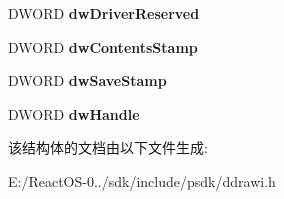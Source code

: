 \begin{DoxyCompactItemize}
\begin{tabbing}
\end{tabbing}\item 
\mbox{\label{struct___d_d_r_a_w_i___d_d_r_a_w_p_a_l_e_t_t_e___g_b_l_adf8b86b586ade3be20c115117d8d916c}} 
D\+W\+O\+RD {\bfseries dw\+Driver\+Reserved}
\item 
\mbox{\label{struct___d_d_r_a_w_i___d_d_r_a_w_p_a_l_e_t_t_e___g_b_l_aa82eb6148316be37f99593e48a3e8ec0}} 
D\+W\+O\+RD {\bfseries dw\+Contents\+Stamp}
\item 
\mbox{\label{struct___d_d_r_a_w_i___d_d_r_a_w_p_a_l_e_t_t_e___g_b_l_a2351e25e139a7c09708bf633c9b56d55}} 
D\+W\+O\+RD {\bfseries dw\+Save\+Stamp}
\item 
\mbox{\label{struct___d_d_r_a_w_i___d_d_r_a_w_p_a_l_e_t_t_e___g_b_l_ab6f25eda084ac600e1255ba748afb37d}} 
D\+W\+O\+RD {\bfseries dw\+Handle}
\end{DoxyCompactItemize}


该结构体的文档由以下文件生成\+:\begin{DoxyCompactItemize}
\item 
E\+:/\+React\+O\+S-\/0../sdk/include/psdk/ddrawi.\+h\end{DoxyCompactItemize}
